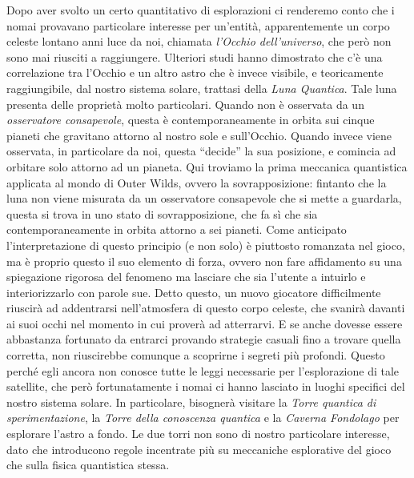\documentclass{book}
\theoremstyle{definition}
\theoremstyle{definition}
\theoremstyle{definition}
\theoremstyle{plain}
\theoremstyle{plain}
\theoremstyle{plain}
\theoremstyle{plain}
\begin{document}
Dopo aver svolto un certo quantitativo di esplorazioni ci renderemo conto che i nomai provavano particolare interesse per un'entità, apparentemente un corpo celeste lontano anni luce da noi, chiamata \emph{l'Occhio dell'universo}, che però non sono mai riusciti a raggiungere. Ulteriori studi hanno dimostrato che c'è una correlazione tra l'Occhio e un altro astro che è invece visibile, e teoricamente raggiungibile, dal nostro sistema solare, trattasi della \emph{Luna Quantica}. Tale luna presenta delle proprietà molto particolari. Quando non è osservata da un \emph{osservatore consapevole}, questa è contemporaneamente in orbita sui cinque pianeti che gravitano attorno al nostro sole e sull'Occhio. Quando invece viene osservata, in particolare da noi, questa ``decide'' la sua posizione, e comincia ad orbitare solo attorno ad un pianeta. Qui troviamo la prima meccanica quantistica applicata al mondo di Outer Wilds, ovvero la sovrapposizione: fintanto che la luna non viene misurata da un osservatore consapevole che si mette a guardarla, questa si trova in uno stato di sovrapposizione, che fa sì che sia contemporaneamente in orbita attorno a sei pianeti. Come anticipato l'interpretazione di questo principio (e non solo) è piuttosto romanzata nel gioco, ma è proprio questo il suo elemento di forza, ovvero non fare affidamento su una spiegazione rigorosa del fenomeno ma lasciare che sia l'utente a intuirlo e interiorizzarlo con parole sue. Detto questo, un nuovo giocatore difficilmente riuscirà ad addentrarsi nell'atmosfera di questo corpo celeste, che svanirà davanti ai suoi occhi nel momento in cui proverà ad atterrarvi. E se anche dovesse essere abbastanza fortunato da entrarci provando strategie casuali fino a trovare quella corretta, non riuscirebbe comunque a scoprirne i segreti più profondi. Questo perché egli ancora non conosce tutte le leggi necessarie per l'esplorazione di tale satellite, che però fortunatamente i nomai ci hanno lasciato in luoghi specifici del nostro sistema solare. In particolare, bisognerà visitare la \emph{Torre quantica di sperimentazione}, la \emph{Torre della conoscenza quantica} e la \emph{Caverna Fondolago} per esplorare l'astro a fondo. Le due torri non sono di nostro particolare interesse, dato che introducono regole incentrate più su meccaniche esplorative del gioco che sulla fisica quantistica stessa. %
\end{document}

